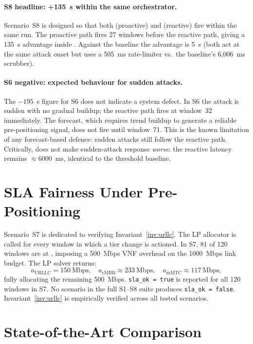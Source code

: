 \paragraph{S8 headline: +135~s within the same orchestrator.}
Scenario~S8 is designed so that both  (proactive) and 
(reactive) fire within the same run. The proactive path fires 27 windows
before the reactive path, giving a 135~s advantage inside \padonap{}.
Against the baseline the advantage is 5~s (both act at the same attack
onset but \padonap{} uses a 505~ms rate-limiter vs.\ the baseline's
6{,}006~ms scrubber).

\paragraph{S6 negative: expected behaviour for sudden attacks.}
The $-195$~s figure for S6 does not indicate a system defect. In S6 the
attack is sudden with no gradual buildup; the reactive path fires at
window~32 immediately. The forecast, which requires trend buildup to
generate a reliable pre-positioning signal, does not fire until
window~71. This is the known limitation of any forecast-based defence:
sudden attacks still follow the reactive path. Critically, \padonap{}
does not make sudden-attack response \emph{worse}: the  reactive
latency remains $\approx 6000$~ms, identical to the threshold baseline.

\section{SLA Fairness Under Pre-Positioning}
\label{sec:sla-fairness}

Scenario~S7 is dedicated to verifying Invariant~\ref{inv:urllc}.
The LP allocator is called for every window in which a tier change is
actioned. In S7, 81 of 120 windows are at , imposing a 500~Mbps
VNF overhead on the 1000~Mbps link budget. The LP solver returns:
\[
  a_{\text{URLLC}} = 150~\text{Mbps},\quad
  a_{\text{eMBB}} \approx 233~\text{Mbps},\quad
  a_{\text{mMTC}} \approx 117~\text{Mbps},
\]
fully allocating the remaining 500~Mbps. \texttt{sla\_ok = true} is
reported for all 120 windows in S7. No scenario in the full S1--S8 suite
produces \texttt{sla\_ok = false}. Invariant~\ref{inv:urllc} is
empirically verified across all tested scenarios.

\section{State-of-the-Art Comparison}
\label{sec:sota}

